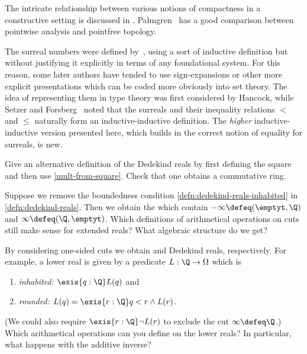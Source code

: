 The intricate relationship between various notions of compactness in a constructive
setting is discussed in \cite{bridges2002compactness}. Palmgren~\cite{Palmgren:FT} has a
good comparison between pointwise analysis and
pointfree topology.

The surreal numbers were defined by~\cite{conway:onag}, using a sort of inductive definition but without justifying it explicitly in terms of any foundational system.
For this reason, some later authors have tended to use sign-expansions or other more explicit presentations which can be coded more obviously into set theory.
The idea of representing them in type theory was first considered by Hancock, while
Setzer and Forsberg~\cite{forsbergfinite} noted that the surreals and their inequality relations $<$ and $\le$ naturally form an inductive-inductive definition.
The \emph{higher} inductive-inductive version presented here, which builds in the correct notion of equality for surreals, is new.


\sectionExercises

\begin{ex}\label{ex:alt-dedekind-reals}
 Give an alternative definition of the Dedekind reals by first defining the square and then use \cref{mult-from-square}.
 Check that one obtains a commutative ring.
\end{ex}

\begin{ex} \label{ex:RD-extended-reals}
  Suppose we remove the boundedness condition
  \ref{defn:dedekind-reals-inhabited} in \cref{defn:dedekind-reals}.
  Then we obtain the 
  which contain $-\infty \defeq
  (\emptyt, \Q)$ and $\infty \defeq (\Q, \emptyt)$. Which definitions of arithmetical
  operations on cuts still make sense for extended reals? What algebraic structure do we
  get?
\end{ex}

\begin{ex} \label{ex:RD-lower-cuts}
  By considering one-sided cuts we obtain  and  Dedekind reals,
  respectively. For example, a lower real is given by a predicate $L : \Q \to \Omega$
  which is
  \begin{enumerate}
  \item \emph{inhabited:} $\exis{q : \Q} L(q)$ and
  \item \emph{rounded:} $L(q) = \exis{r : \Q} q < r \land L(r)$.
  \end{enumerate}
  (We could also require $\exis{r : \Q} \lnot L(r)$ to exclude the cut $\infty \defeq
  \Q$.) Which arithmetical operations can you define on the lower reals? In particular,
  what happens with the additive inverse?
\end{ex}

